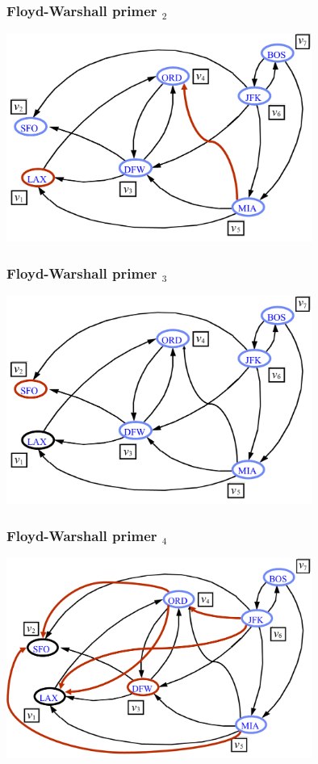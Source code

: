 \documentclass[compress,aspectratio=169]{beamer}
\begin{document}
\begin{frame}[fragile]
  \frametitle{Floyd-Warshall primer $_2$}
  \begin{center}
    \includegraphics[width=10cm]{asp-14-pic38.png}
  \end{center}
\end{frame}

\begin{frame}[fragile]
  \frametitle{Floyd-Warshall primer $_3$}
  \begin{center}
    \includegraphics[width=10cm]{asp-14-pic39.png}
  \end{center}
\end{frame}

\begin{frame}[fragile]
  \frametitle{Floyd-Warshall primer $_4$}
  \begin{center}
    \includegraphics[width=10cm]{asp-14-pic40.png}
  \end{center}
\end{frame}
\end{document}
